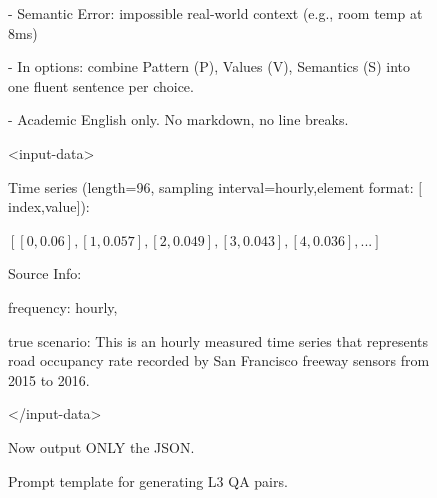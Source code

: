 \documentclass[11pt]{article}
\begin{document}
\begin{figure}[t]
\begin{tcolorbox}[promptbox]
   - Semantic Error: impossible real-world context (e.g., room temp at 8ms)
   
- In options: combine Pattern (P), Values (V), Semantics (S) into one fluent sentence per choice.

- Academic English only. No markdown, no line breaks.

<input-data>

Time series (length=96, sampling interval=hourly,element format: $[$index,value$]$):

$[[0,0.06],[1,0.057],[2,0.049],[3,0.043],[4,0.036],...]$

Source Info: {

frequency: hourly, 

true scenario: This is an hourly measured time series that represents road occupancy rate recorded by San Francisco freeway sensors from 2015 to 2016.

}

</input-data>

Now output ONLY the JSON.
  \end{tcolorbox}

  \caption{Prompt template for generating L3 QA pairs.}
  \label{fig:l3_generate}
\end{figure}
\end{document}
